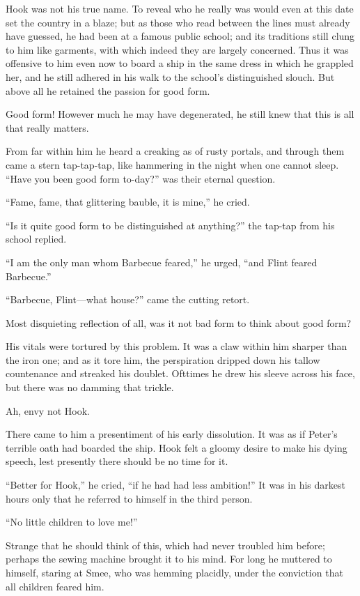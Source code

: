 Hook was not his true name. To reveal who he really was would even at
this date set the country in a blaze; but as those who read between the
lines must already have guessed, he had been at a famous public school;
and its traditions still clung to him like garments, with which indeed
they are largely concerned. Thus it was offensive to him even now to
board a ship in the same dress in which he grappled her, and he still
adhered in his walk to the school's distinguished slouch. But above all
he retained the passion for good form.

Good form! However much he may have degenerated, he still knew that
this is all that really matters.

From far within him he heard a creaking as of rusty portals, and
through them came a stern tap-tap-tap, like hammering in the night when
one cannot sleep. ``Have you been good form to-day?'' was their eternal
question.

``Fame, fame, that glittering bauble, it is mine,'' he cried.

``Is it quite good form to be distinguished at anything?'' the tap-tap
from his school replied.

``I am the only man whom Barbecue feared,'' he urged, ``and Flint feared
Barbecue.''

``Barbecue, Flint---what house?'' came the cutting retort.

Most disquieting reflection of all, was it not bad form to think about
good form?

His vitals were tortured by this problem. It was a claw within him
sharper than the iron one; and as it tore him, the perspiration dripped
down his tallow countenance and streaked his doublet. Ofttimes he drew
his sleeve across his face, but there was no damming that trickle.

Ah, envy not Hook.

There came to him a presentiment of his early dissolution. It was as if
Peter's terrible oath had boarded the ship. Hook felt a gloomy desire
to make his dying speech, lest presently there should be no time for
it.

``Better for Hook,'' he cried, ``if he had had less ambition!'' It was in
his darkest hours only that he referred to himself in the third person.

``No little children to love me!''

Strange that he should think of this, which had never troubled him
before; perhaps the sewing machine brought it to his mind. For long he
muttered to himself, staring at Smee, who was hemming placidly, under
the conviction that all children feared him.

